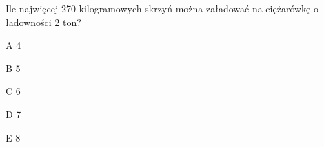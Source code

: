 \begin{tresc}
Ile najwięcej 270-kilogramowych skrzyń można załadować na ciężarówkę o ładowności 2 ton?
\end{tresc}
\begin{wariant}{A} 4 \end{wariant}
\begin{wariant}{B} 5 \end{wariant}
\begin{wariant}{C} 6 \end{wariant}
\begin{wariant}{D} 7 \end{wariant}
\begin{wariant}{E} 8 \end{wariant}
